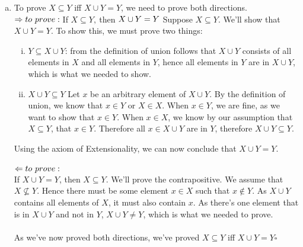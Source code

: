 \begin{itemize}
\begin{enumerate}[(a)]
          \item To prove $X\subseteq Y$ iff $X\cup Y = Y$, we need to prove both directions.\\$\Rightarrow\\ to\ prove:\\$If $ X\subseteq Y,\ $then $ X\cup Y = Y \\$ Suppose $X \subseteq Y$. We'll show that $X \cup Y = Y$. To show this, we must prove two things: \begin{enumerate}[(i)]
                                                                                                                                                                                                                                                                         \item $Y \subseteq X \cup Y$: from the definition of union follows that $X\cup Y$ consists of all elements in $X$ and all elements in $Y$, hence all elements in $Y$ are in $X\cup Y$, which is what we needed to show.
                                                                                                                                                                                                                                                                         \item $X\cup Y \subseteq Y$ Let $x$ be an arbitrary element of $X \cup Y$. By the definition of union, we know that $x \in Y$ or $X \in X$. When $x \in Y$, we are fine, as we want to show that $x \in Y$. When $x \in X$, we know by our assumption that $X\subseteq Y$, that $x \in Y$. Therefore all $x \in X\cup Y$ are in $Y$, therefore $X\cup Y \subseteq Y$.
                                                                                                                                                                                                                                                                       \end{enumerate}
            Using the axiom of Extensionality, we can now conclude that $X \cup Y = Y$. \\\\
            $\Leftarrow\\to\ prove:$\\If $X\cup Y=Y$, then $X\subseteq Y$. We'll prove the contrapositive. We assume that $X \not \subseteq Y$. Hence there must be some element $x\in X$ such that $x\not \in Y$. As $X \cup Y$ contains all elements of $X$, it must also contain $x$. As there's one element that is in $X\cup Y$ and not in $Y$, $X \cup Y \neq Y$, which is what we needed to prove.\\\\ As we've now proved both directions, we've proved $X\subseteq Y$ iff $X\cup Y = Y \square$


\end{enumerate}
\end{itemize}
